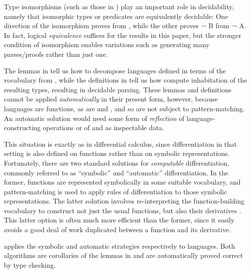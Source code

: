 \documentclass[acmsmall,screen,timestamp,anonymous,review]{acmart}
\begin{document}
Type isomorphisms (such as those in ) play an important role in decidability, namely that isomorphic types or predicates are equivalently decidable:
One direction of the isomorphism proves  from , while the other proves {\AF ¬ B} from {\AF ¬ A}.
In fact, logical \emph{equivalence} suffices for the results in this paper, but the stronger condition of isomorphism enables variations such as generating many parses/proofs rather than just one.



The lemmas in  tell us how to decompose languages defined in terms of the vocabulary from , while the definitions in  tell us how compute inhabitation of the resulting types, resulting in decidable parsing.
These lemmas and definitions cannot be applied \emph{automatically} in their present form, however, because languages are functions, as are  and , and so are not subject to pattern-matching.
An automatic solution would need some form of \emph{reflection} of language-constructing operations or of  and  as inspectable data.

This situation is exactly as in differential calculus, since differentiation in that setting is also defined on functions rather than on symbolic representations.
Fortunately, there are two standard solutions for \emph{computable} differentiation, commonly referred to as ``symbolic'' and ``automatic'' differentiation.
In the former, functions are represented symbolically in some suitable vocabulary, and pattern-matching is used to apply rules of differentiation to those symbolic representations.
The latter solution involves re-interpreting the function-building vocabulary to construct not just the usual functions, but also their derivatives \citep{Griewank89onAD, GriewankWalther2008EvalDerivs, Elliott-2018-ad-icfp}.
This latter option is often much more efficient than the former, since it easily avoids a good deal of work duplicated between a function and its derivative.

 applies the symbolic and automatic strategies respectively to languages.
Both algorithms are corollaries of the lemmas in  and are automatically proved correct by type checking.
\end{document}
